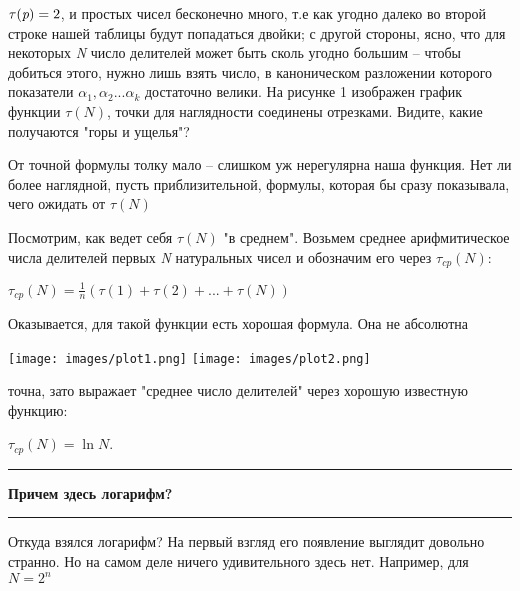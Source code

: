 \documentclass{article}
\begin{document}
\begin{multicols}{3}
\begin{math}
    \tau(\emph{p}) = 2
\end{math}, и простых чисел бесконечно много, т.е как угодно далеко во второй строке нашей таблицы будут попадаться двойки; с другой стороны, ясно, что для некоторых \emph{N} число делителей может быть сколь угодно большим -- чтобы добиться этого, нужно лишь взять число, в каноническом разложении которого показатели 
\begin{math}
\alpha_1, \alpha_2 ... \alpha_k
\end{math} достаточно велики.
На рисунке 1 изображен график функции \begin{math}
    \tau(N)
\end{math}, точки для наглядности соединены отрезками. Видите, какие получаются "горы и ущелья"?

От точной формулы толку мало -- слишком уж нерегулярна наша функция. Нет ли более наглядной, пусть приблизительной, формулы, которая бы сразу показывала, чего ожидать от \begin{math}
    \tau(N)
\end{math}

Посмотрим, как ведет себя \begin{math}
    \tau(N)
\end{math} "в среднем". Возьмем среднее арифмитическое числа делителей первых \emph{N} натуральных чисел и обозначим его через \begin{math}
    \tau_{cp}(N):
\end{math} 

\begin{math}
     \tau_{cp}(N) = \frac{1}{n}(\tau(1) + \tau(2) + ... + \tau(N))
\end{math}

Оказывается, для такой функции есть хорошая формула. Она не абсолютна 

\texttt{[image: images/plot1.png]}
\texttt{[image: images/plot2.png]}

точна, зато выражает "среднее число делителей" через хорошую известную функцию:

\begin{math}
    \tau_{cp}(N) = \ln N
\end{math}.

\noindent\rule{4cm}{0.5pt}
\normalsize{\textbf{Причем здесь логарифм?}}
\noindent\rule{4cm}{0.5pt}

Откуда взялся логарифм? На первый взгляд его появление выглядит довольно странно. Но на самом деле ничего удивительного здесь нет. Например, для \begin{math}
    N = 2^n
\end{math}


\end{multicols}
\end{document}
